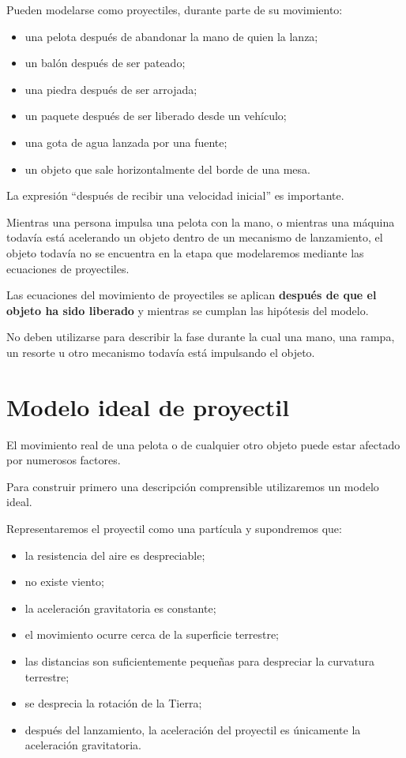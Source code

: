 Pueden modelarse como proyectiles, durante parte de su movimiento:

\begin{itemize}
    \item una pelota después de abandonar la mano de quien la lanza;
    \item un balón después de ser pateado;
    \item una piedra después de ser arrojada;
    \item un paquete después de ser liberado desde un vehículo;
    \item una gota de agua lanzada por una fuente;
    \item un objeto que sale horizontalmente del borde de una mesa.
\end{itemize}

La expresión ``después de recibir una velocidad inicial'' es importante.

Mientras una persona impulsa una pelota con la mano, o mientras una máquina
todavía está acelerando un objeto dentro de un mecanismo de lanzamiento, el
objeto todavía no se encuentra en la etapa que modelaremos mediante las
ecuaciones de proyectiles.

\begin{advertencia}
Las ecuaciones del movimiento de proyectiles se aplican \textbf{después de que
el objeto ha sido liberado} y mientras se cumplan las hipótesis del modelo.

No deben utilizarse para describir la fase durante la cual una mano, una rampa,
un resorte u otro mecanismo todavía está impulsando el objeto.
\end{advertencia}


\section{Modelo ideal de proyectil}

El movimiento real de una pelota o de cualquier otro objeto puede estar afectado
por numerosos factores.

Para construir primero una descripción comprensible utilizaremos un modelo
ideal.

\begin{modelo}
Representaremos el proyectil como una partícula y supondremos que:

\begin{itemize}
    \item la resistencia del aire es despreciable;
    \item no existe viento;
    \item la aceleración gravitatoria es constante;
    \item el movimiento ocurre cerca de la superficie terrestre;
    \item las distancias son suficientemente pequeñas para despreciar la curvatura
    terrestre;
    \item se desprecia la rotación de la Tierra;
    \item después del lanzamiento, la aceleración del proyectil es únicamente la
    aceleración gravitatoria.
\end{itemize}
\end{modelo}

